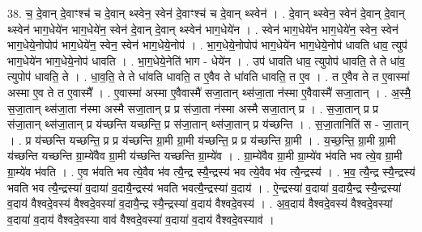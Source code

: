 \documentclass[17pt]{extarticle}
\begin{document}
38. च॒ दे॒वान् दे॒वाꣳश्च॑ च दे॒वान् थ्स्वेन॒ स्वेन॑ दे॒वाꣳश्च॑ च दे॒वान् थ्स्वेन॑ । . दे॒वान् थ्स्वेन॒ स्वेन॑ दे॒वान् दे॒वान् थ्स्वेन॑ भाग॒धेये॑न भाग॒धेये॑न॒ स्वेन॑ दे॒वान् दे॒वान् थ्स्वेन॑ भाग॒धेये॑न । . स्वेन॑ भाग॒धेये॑न भाग॒धेये॑न॒ स्वेन॒ स्वेन॑ भाग॒धेये॒नोपोप॑ भाग॒धेये॑न॒ स्वेन॒ स्वेन॑ भाग॒धेये॒नोप॑ । . भा॒ग॒धेये॒नोपोप॑ भाग॒धेये॑न भाग॒धेये॒नोप॑ धावति धाव॒ त्युप॑ भाग॒धेये॑न भाग॒धेये॒नोप॑ धावति । . भा॒ग॒धेये॒नेति॑ भाग - धेये॑न । . उप॑ धावति धाव॒ त्युपोप॑ धावति॒ ते ते धा॑व॒ त्युपोप॑ धावति॒ ते । . धा॒व॒ति॒ ते ते धा॑वति धावति॒ त ए॒वैव ते धा॑वति धावति॒ त ए॒व । . त ए॒वैव ते त ए॒वास्मा॑ अस्मा ए॒व ते त ए॒वास्मै᳚ । . ए॒वास्मा॑ अस्मा ए॒वैवास्मै॑ सजा॒तान् थ्स॑जा॒ता न॑स्मा ए॒वैवास्मै॑ सजा॒तान् । . अ॒स्मै॒ स॒जा॒तान् थ्स॑जा॒ता न॑स्मा अस्मै सजा॒तान् प्र प्र स॑जा॒ता न॑स्मा अस्मै सजा॒तान् प्र । . स॒जा॒तान् प्र प्र स॑जा॒तान् थ्स॑जा॒तान् प्र य॑च्छन्ति यच्छन्ति॒ प्र स॑जा॒तान् थ्स॑जा॒तान् प्र य॑च्छन्ति । . स॒जा॒तानिति॑ स - जा॒तान् । . प्र य॑च्छन्ति यच्छन्ति॒ प्र प्र य॑च्छन्ति ग्रा॒मी ग्रा॒मी य॑च्छन्ति॒ प्र प्र य॑च्छन्ति ग्रा॒मी । . य॒च्छ॒न्ति॒ ग्रा॒मी ग्रा॒मी य॑च्छन्ति यच्छन्ति ग्रा॒म्ये॑वैव ग्रा॒मी य॑च्छन्ति यच्छन्ति ग्रा॒म्ये॑व । . ग्रा॒म्ये॑वैव ग्रा॒मी ग्रा॒म्ये॑व भ॑वति भव त्ये॒व ग्रा॒मी ग्रा॒म्ये॑व भ॑वति । . ए॒व भ॑वति भव त्ये॒वैव भ॑व त्यै॒न्द्र स्यै॒न्द्रस्य॑ भव त्ये॒वैव भ॑व त्यै॒न्द्रस्य॑ । . भ॒व॒ त्यै॒न्द्र स्यै॒न्द्रस्य॑ भवति भव त्यै॒न्द्रस्या॑ व॒दाया॑ व॒दायै॒न्द्रस्य॑ भवति भवत्यै॒न्द्रस्या॑ व॒दाय॑ । . ऐ॒न्द्रस्या॑ व॒दाया॑ व॒दायै॒न्द्र स्यै॒न्द्रस्या॑ व॒दाय॑ वैश्वदे॒वस्य॑ वैश्वदे॒वस्या॑ व॒दायै॒न्द्र स्यै॒न्द्रस्या॑ व॒दाय॑ वैश्वदे॒वस्य॑ । . अ॒व॒दाय॑ वैश्वदे॒वस्य॑ वैश्वदे॒वस्या॑ व॒दाया॑ व॒दाय॑ वैश्वदे॒वस्या वाव॑ वैश्वदे॒वस्या॑ व॒दाया॑ व॒दाय॑ वैश्वदे॒वस्याव॑ । \newline
\end{document}

